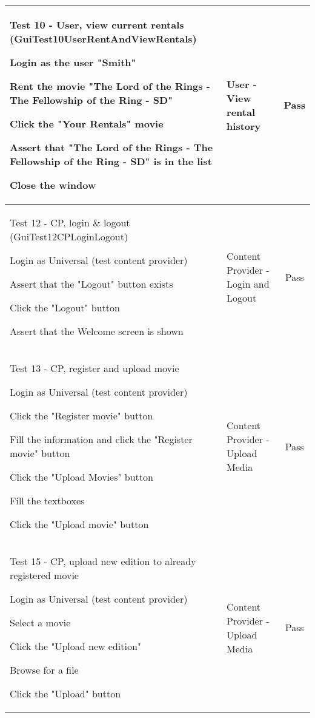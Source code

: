\begin{centering}
\begin{longtable}{| p{5 cm} | p{7 cm} | c |}
\hline
Test 10 - User, view current rentals (GuiTest10UserRentAndViewRentals)
\begin{my_enumerate}
\item Login as the user "Smith"
\item Rent the movie "The Lord of the Rings - The Fellowship of the Ring - SD"
\item Click the "Your Rentals" movie
\item Assert that "The Lord of the Rings - The Fellowship of the Ring - SD" is in the list
\item Close the window
\end{my_enumerate} & User - View rental history & Pass  \\

\hline
Test 12 - CP, login \& logout (GuiTest12CPLoginLogout)
\begin{my_enumerate}
\item Login as Universal (test content provider)
\item Assert that the "Logout" button exists
\item Click the "Logout" button
\item Assert that the Welcome screen is shown
\end{my_enumerate} & Content Provider - Login and Logout & Pass \\

\hline
Test 13 - CP, register and upload movie
\begin{my_enumerate}
\item Login as Universal (test content provider)
\item Click the "Register movie" button
\item Fill the information and click the "Register movie" button
\item Click the "Upload Movies" button
\item Fill the textboxes
\item Click the "Upload movie" button
\end{my_enumerate} & Content Provider - Upload Media & Pass  \\

\hline
Test 15 - CP, upload new edition to already registered movie
\begin{my_enumerate}
\item Login as Universal (test content provider)
\item Select a movie
\item Click the "Upload new edition"
\item Browse for a file
\item Click the "Upload" button
\end{my_enumerate} & Content Provider - Upload Media & Pass  \\


\end{longtable}
\end{centering}

